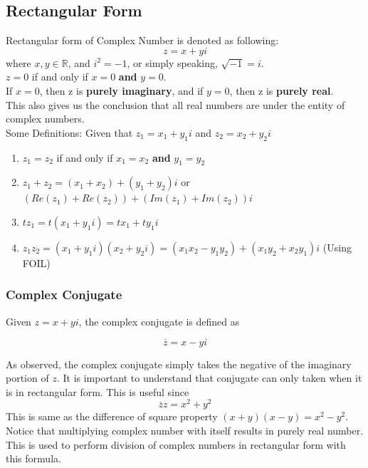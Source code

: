 \documentclass[12pt]{article}
\newcommand{\R}{\mathbb{R}}
\begin{document}
\subsection{Rectangular Form}
Rectangular form of Complex Number is denoted as following:\\
\begin{equation}
z = x+yi
\end{equation}
where $x,y\in \R$, and $i^2 = -1$, or simply speaking, $\sqrt{-1} = i$.\\
$z = 0$ if and only if $x = 0$ \textbf{and} $y = 0$.\\
If $x = 0$, then z is \textbf{purely imaginary}, and if $y = 0$, then z is \textbf{purely real}.\\
This also gives us the conclusion that all real numbers are under the entity of complex numbers. \\
Some Definitions: Given that $z_1 = x_1 + y_1i$ and $z_2 = x_2+y_2i$
\begin{enumerate}
\item $z_1 = z_2$ if and only if $x_1 = x_2$ \textbf{and} $y_1 = y_2$
\item $z_1 + z_2 = (x_1 +  x_2) + (y_1+y_2)i$ or $(Re(z_1) + Re(z_2)) + (Im(z_1)+Im(z_2))i$
\item $tz_1 = t(x_1+y_1i) = tx_1 + ty_1i$
\item $z_1z_2 = (x_1+y_1i)(x_2+y_2i)=(x_1x_2-y_1y_2) + (x_1y_2+x_2y_1)i$ (Using FOIL)
\end{enumerate} \cite{Textbook}

\subsubsection{Complex Conjugate}
Given $z=x+yi$, the complex conjugate is defined as 

\begin{equation}
\overline{z} = x-yi
\end{equation}

As observed, the complex conjugate simply takes the negative of the imaginary portion of $z$. It is important to understand that conjugate can only taken when it is in rectangular form.  This is useful since 
\begin{equation}
\overline{z}z = x^2 + y^2
\end{equation}
This is same as the difference of square property $(x+y)(x-y) = x^2 - y^2$. Notice that multiplying complex number with itself results in purely real number. This is used to perform division of complex numbers in rectangular form with this formula.\\
\end{document}
